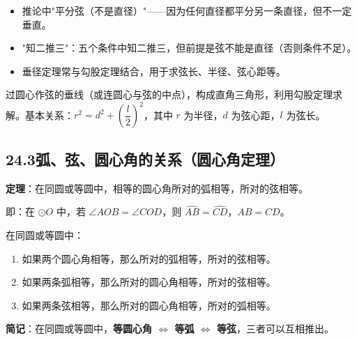 \documentclass[12pt, a4paper]{ctexart}
\begin{document}
\begin{warnbox}[易错提醒]
\begin{itemize}[nosep]
  \item 推论中"平分弦（不是直径）"——因为任何直径都平分另一条直径，但不一定垂直。
  \item "知二推三"：五个条件中知二推三，但前提是弦不能是直径（否则条件不足）。
  \item 垂径定理常与勾股定理结合，用于求弦长、半径、弦心距等。
\end{itemize}
\end{warnbox}

\begin{tipbox}[垂径定理的常用辅助线]
过圆心作弦的垂线（或连圆心与弦的中点），构成直角三角形，利用勾股定理求解。基本关系：$r^2 = d^2 + \left(\dfrac{l}{2}\right)^2$，其中 $r$ 为半径，$d$ 为弦心距，$l$ 为弦长。
\end{tipbox}

\subsection*{24.3\quad 弧、弦、圆心角的关系（圆心角定理）}

\begin{knowledgebox}[圆心角定理]
\textbf{定理}：在同圆或等圆中，相等的圆心角所对的弧相等，所对的弦相等。

即：在 $\odot O$ 中，若 $\angle AOB = \angle COD$，则 $\widehat{AB} = \widehat{CD}$，$AB = CD$。
\end{knowledgebox}

\begin{knowledgebox}[圆心角定理的推论]
在同圆或等圆中：
\begin{enumerate}[nosep]
  \item 如果两个圆心角相等，那么所对的弧相等，所对的弦相等。
  \item 如果两条弧相等，那么所对的圆心角相等，所对的弦相等。
  \item 如果两条弦相等，那么所对的圆心角相等，所对的弧相等。
\end{enumerate}
\textbf{简记}：在同圆或等圆中，\textbf{等圆心角 $\Leftrightarrow$ 等弧 $\Leftrightarrow$ 等弦}，三者可以互相推出。
\end{knowledgebox}
\end{document}
